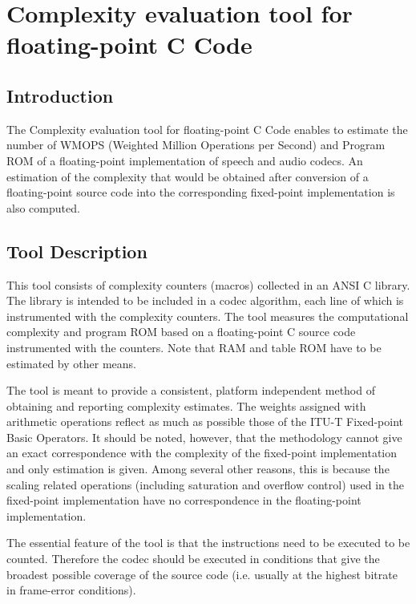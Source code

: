 \section{Complexity evaluation tool for floating-point C Code}

\subsection{Introduction}
The Complexity evaluation tool for floating-point C Code enables to 
estimate the number of WMOPS (Weighted Million Operations per Second) 
and Program ROM of a floating-point implementation of speech and audio 
codecs. An estimation of the complexity that would be obtained 
after conversion of a floating-point source code into the corresponding 
fixed-point implementation is also computed.

\subsection{Tool Description }
This tool consists of complexity counters (macros) collected in an ANSI 
C library. The library is intended to be included in a codec algorithm, 
each line of which is instrumented with the complexity counters. The 
tool measures the computational complexity and program ROM based on a 
floating-point C source code instrumented with the counters. Note that 
RAM and table ROM have to be estimated by other means. 

The tool is meant to provide a consistent, platform independent method 
of obtaining and reporting complexity estimates. The weights assigned 
with arithmetic operations reflect as much as possible those of the 
ITU-T Fixed-point Basic Operators. It should be noted, however, that the methodology 
cannot give an exact correspondence with the complexity of the fixed-point implementation and only estimation is given. Among several other 
reasons, this is because the scaling related operations (including 
saturation and overflow control) used in the fixed-point implementation 
have no correspondence in the floating-point implementation.

The essential feature of the tool is that the instructions need to be 
executed to be counted. Therefore the codec should be executed in 
conditions that give the broadest possible coverage of the source code 
(i.e. usually at the highest bitrate in frame-error conditions).

